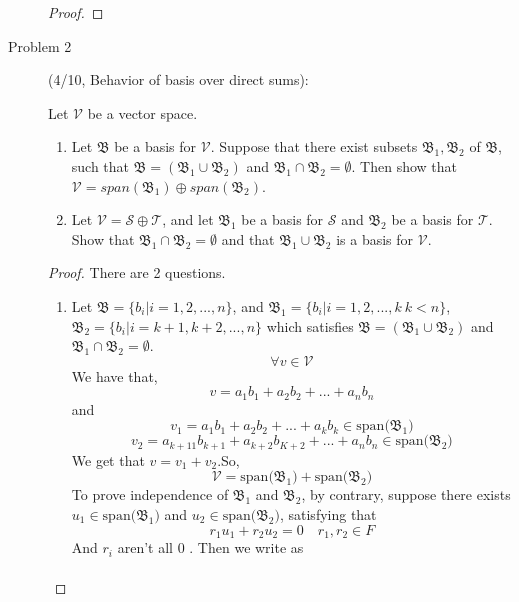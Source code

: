 \documentclass[a4paper]{article}
\begin{document}
\begin{description}
\begin{proof}
 \end{proof}

 \item[Problem 2](4/10, Behavior of basis over direct sums):{

       Let $\mathcal{V}$ be a vector space.
       \begin{enumerate}
        \item Let $\mathfrak{B}$ be a basis for $\mathcal{\mathcal{V}}$. Suppose that  there
              exist subsets $\mathfrak{B}_{1},\mathfrak{B}_2$ of $\mathfrak{B}$,
              such that $\mathfrak{B}=(\mathfrak{B}_{1}\cup\mathfrak{B}_{2})$ and
              $\mathfrak{B}_{1}\cap\mathfrak{B}_{2}=\emptyset$. Then show
              that $\mathcal{\mathcal{V}}=span(\mathfrak{B}_{1})\oplus span(\mathfrak{B}_{2})$.
        \item Let $\mathcal{\mathcal{V}}=\mathcal{S}\oplus\mathcal{T}$, and let $\mathfrak{B}_{1}$ be a basis for $\mathcal{S}$ and $\mathfrak{B}_{2}$ be a basis for $\mathcal{T}$.
              Show that $\mathfrak{B}_{1}\cap\mathfrak{B}_{2}=\emptyset$ and that $\mathfrak{B}_{1}\cup\mathfrak{B}_{2}$ is a basis for $\mathcal{V}$.
       \end{enumerate}
 }
 \begin{proof}
  There are 2 questions.
  \begin{enumerate}
   \item Let $\mathfrak{B}=\{b_{i} | i=1,2,...,n\}$, and
         $\mathfrak{B}_{1}=\{b_{i} | i=1,2,...,k\  k<n\}$,$\mathfrak{B}_{2}=\{b_{i}| i=k+1,k+2,...,n\}$
         which satisfies
         $\mathfrak{B}=(\mathfrak{B}_{1}\cup\mathfrak{B}_{2})$ and
         $\mathfrak{B}_{1}\cap\mathfrak{B}_{2}=\emptyset$.
         $$\forall  v  \in   \mathcal{V}$$
         We have that,
         $$v=a_{1}b_{1}+a_{2}b_{2}+...+a_{n}b_{n}$$
         and
         $$v_{1}=a_{1}b_{1}+a_{2}b_{2}+...+a_{k}b_{k} \in \text{span($\mathfrak{B}_{1}$)}$$
         $$v_{2}=a_{k+11}b_{k+1}+a_{k+2}b_{K+2}+...+a_{n}b_{n} \in \text{span($\mathfrak{B}_{2}$)}$$
         We get that $v=v_{1}+v_{2}$.So, $$\mathcal{V}=\text{span($\mathfrak{B}_{1}$)}+\text{span($\mathfrak{B}_{2}$)}$$
         To prove independence of $\mathfrak{B}_{1}$ and $\mathfrak{B}_{2}$,
         by contrary, suppose there exists $u_{1}\in \text{span($\mathfrak{B}_{1}$)}$ and
         $u_{2}\in \text{span($\mathfrak{B}_{2}$)}$, satisfying that
         $$r_{1}u_{1}+r_{2}u_{2}=0\quad r_{1},r_{2}\in F$$
         And $r_{i}$ aren't all $0$ . Then we write as
         \begin{align*}

\end{align*}
\end{enumerate}
\end{proof}
\end{description}
\end{document}
